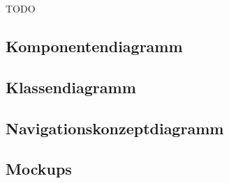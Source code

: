 TODO

\subsection{Komponentendiagramm}

\subsection{Klassendiagramm}

\subsection{Navigationskonzeptdiagramm}

\subsection{Mockups}
